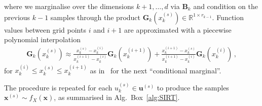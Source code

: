 where we marginalise over the dimensions $k+1 , \dots, d$ via $\bm{B}_k$ and condition on the previous $k-1$ samples through the product $\bm{G}_k(x^{(s)}_k)\in \mathbb{R}^{1 \times r_{k-1}}$. 
Function values between grid points $i$ and $i+1$ are approximated with a piecewise polynomial interpolation
\begin{align}
	\bm{G}_k(x^{(s)}_k) \approx   \frac{x^{(s)}_k - x^{(i)}_k }{x^{(i+1)}_k -x^{(i)}_k } \bm{G}_k(x^{(i+1)}_k) + \frac{ x^{(i+1)}_k - x^{(s)}_k}{x^{(i+1)}_k -x^{(i)}_k } \bm{G}_k(x^{(i)}_k) \, ,
	\label{eq:LinPol}
\end{align}
for $x^{(i)}_k \leq x^{(s)}_k \leq x^{(i+1)}_k$ as in~\cite{dolgov2020approximation} for the next ``conditional marginal''.

The procedure is repeated for each $u^{(s)}_k \in \bm{u}^{(s)}$ to produce the samples $\bm{x}^{(s)} \sim f_{X}(\bm{x})$, as summarised in Alg.~Box~\ref{alg:SIRT}.%




